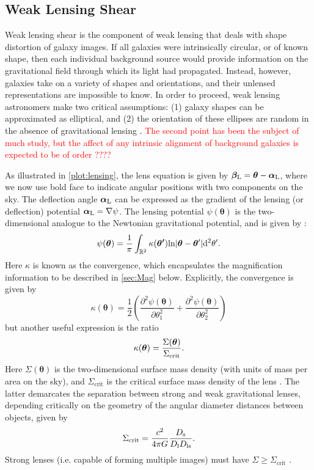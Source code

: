 \subsection{Weak Lensing Shear}
\label{sec:Shear}
Weak lensing shear is the component of weak lensing that deals with shape distortion of galaxy images. If all galaxies were intrinsically circular, or of known shape, then each individual background source would provide information on the gravitational field through which its light had propagated. Instead, however, galaxies take on a variety of shapes and orientations, and their unlensed representations are impossible to know. In order to proceed, weak lensing astronomers make two critical assumptions: (1) galaxy shapes can be approximated as elliptical, and (2) the orientation of these ellipses are random in the absence of gravitational lensing \citep{BS01}. \textcolor{red}{The second point has been the subject of much study, but the affect of any intrinsic alignment of background galaxies is expected to be of order ????}

As illustrated in \autoref{plot:lensing}, the lens equation is given by $\bm{\beta}_{\rm L} = \bm{\theta} - \bm{\alpha}_{\rm L}$, where we now use bold face to indicate angular positions with two components on the sky. The deflection angle $\bm{\alpha}_{\rm L}$ can be expressed as the gradient of the lensing (or deflection) potential $\bm{\alpha}_{\rm L} = \nabla \psi$. The lensing potential $\psi(\bm{\theta})$ is the two-dimensional analogue to the Newtonian gravitational potential, and is given by \citep{Schneider06_IntroGravLensCosmology}:
\begin{equation}
\psi(\bm{\theta}) = \frac{1}{\pi} \int_{\mathbb{R}^2} \kappa(\bm{\theta'}) {\rm ln}|\bm{\theta} - \bm{\theta}'| {\rm d}^2 \theta'.
\end{equation}
Here $\kappa$ is known as the convergence, which encapsulates the magnification information to be described in \autoref{sec:Mag} below. Explicitly, the convergence is given by
\begin{equation}
\kappa(\bm{\theta}) =\frac{1}{2} \left( \frac{\partial^2 \psi(\bm{\theta})}{\partial\theta_1^2} + \frac{\partial^2 \psi(\bm{\theta})}{\partial\theta_2^2} \right)
\end{equation}
but another useful expression is the ratio
\begin{equation}
\label{eqn:kappa}
\kappa(\bm{\theta}) = \frac{\Sigma(\bm{\theta})}{\Sigma_{\rm crit}}.
\end{equation}
Here $\Sigma(\bm{\theta})$ is the two-dimensional surface mass density (with units of mass per area on the sky), and $\Sigma_{\mathrm{crit}}$ is the critical surface mass density of the lens \citep{Wright00}. The latter demarcates the separation between strong and weak gravitational lenses, depending critically on the geometry of the angular diameter distances between objects, given by
\begin{equation}
\label{eqn:sigcrit}
\Sigma_{\mathrm{crit}} = \frac{c^2}{4 \pi G} \frac{D_{\rm s}}{D_{\rm l} D_{\rm ls}}.
\end{equation}
Strong lenses (i.e. capable of forming multiple images) must have $\Sigma \ge \Sigma_{\mathrm{crit}}$ \citep{Schneider06_IntroGravLensCosmology}.

